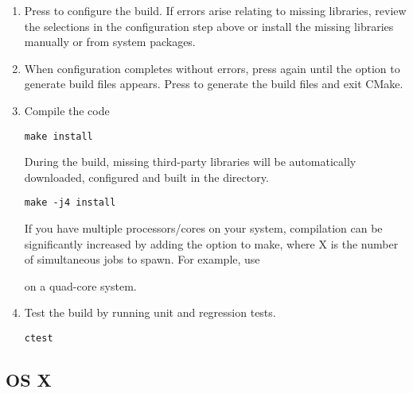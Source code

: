 \begin{enumerate}
    \item Press  to configure the build. If errors arise relating to
    missing libraries, review the  selections in
    the configuration step above or install the missing libraries manually or
    from system packages.

    \item When configuration completes without errors, press  again
    until the option  to generate build files appears. Press 
    to generate the build files and exit CMake.

    \item Compile the code
    \begin{lstlisting}[style=BashInputStyle]
        make install
    \end{lstlisting}
    During the build, missing third-party libraries will be automatically
    downloaded, configured and built in the \nekpp {} directory.

    \newsavebox\installationLinuxTip
    \begin{lrbox}{\installationLinuxTip}\begin{minipage}{0.8\linewidth}
    \begin{lstlisting}[style=BashInputStyle]
    make -j4 install
    \end{lstlisting}
    \end{minipage}
    \end{lrbox}

    \begin{tipbox}
    If you have multiple processors/cores on your system, compilation can be
    significantly increased by adding the  option to make, where X is
    the number of simultaneous jobs to spawn. For example, use

    \noindent\usebox\installationLinuxTip

    on a quad-core system.
    \end{tipbox}

    \item Test the build by running unit and regression tests.
    \begin{lstlisting}[style=BashInputStyle]
    ctest
    \end{lstlisting}
\end{enumerate}

\subsection{OS X}

